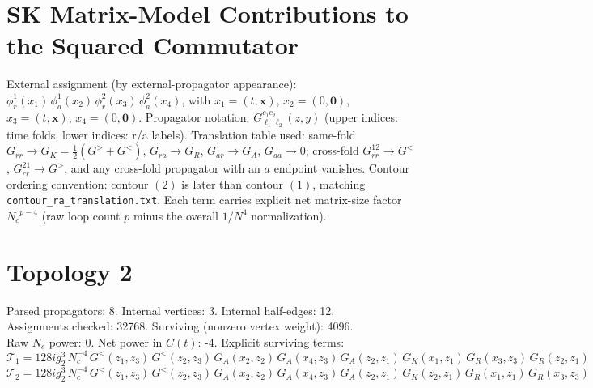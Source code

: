 \documentclass{article}
\begin{document}
\section*{SK Matrix-Model Contributions to the Squared Commutator}
External assignment (by external-propagator appearance): $\phi_r^1(x_1)\,\phi_a^1(x_2)\,\phi_r^2(x_3)\,\phi_a^2(x_4)$, with $x_1=(t,\mathbf{x})$, $x_2=(0,\mathbf{0})$, $x_3=(t,\mathbf{x})$, $x_4=(0,\mathbf{0})$.
Propagator notation: $G^{c_1 c_2}_{\ell_1\ell_2}(z,y)$ (upper indices: time folds, lower indices: r/a labels).
Translation table used: same-fold $G_{rr}\to G_K=\frac12(G^>+G^<)$, $G_{ra}\to G_R$, $G_{ar}\to G_A$, $G_{aa}\to 0$; cross-fold $G^{12}_{rr}\to G^<$, $G^{21}_{rr}\to G^>$, and any cross-fold propagator with an $a$ endpoint vanishes.
Contour ordering convention: contour $(2)$ is later than contour $(1)$, matching \texttt{contour\_ra\_translation.txt}.
Each term carries explicit net matrix-size factor ${N_c}^{p-4}$ (raw loop count $p$ minus the overall $1/N^4$ normalization).
\section*{Topology 2}
\noindent Parsed propagators: 8. Internal vertices: 3. Internal half-edges: 12.\\
\noindent Assignments checked: 32768. Surviving (nonzero vertex weight): 4096.\\
\noindent Raw $N_c$ power: 0. Net power in $C(t)$: -4.
\noindent Explicit surviving terms:
\begin{equation*}
\mathcal{T}_{1} = 128 i g_{2}^{3}\,N_c^{-4}\,G^<\left(z_{1},z_{3}\right) \, G^<\left(z_{2},z_{3}\right) \, G_A\left(x_2,z_{2}\right) \, G_A\left(x_4,z_{3}\right) \, G_A\left(z_{2},z_{1}\right) \, G_K\left(x_1,z_{1}\right) \, G_R\left(x_3,z_{3}\right) \, G_R\left(z_{2},z_{1}\right)
\end{equation*}
\begin{equation*}
\mathcal{T}_{2} = 128 i g_{2}^{3}\,N_c^{-4}\,G^<\left(z_{1},z_{3}\right) \, G^<\left(z_{2},z_{3}\right) \, G_A\left(x_2,z_{2}\right) \, G_A\left(x_4,z_{3}\right) \, G_A\left(z_{2},z_{1}\right) \, G_K\left(z_{2},z_{1}\right) \, G_R\left(x_1,z_{1}\right) \, G_R\left(x_3,z_{3}\right)
\end{equation*}
\end{document}
